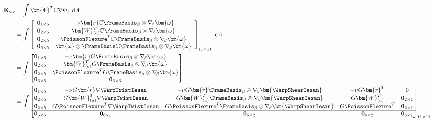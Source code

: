 \begin{ComponentExpression}
$$
\begin{aligned}
\mathbf{K}_{\rm wv} &= \int \bm{\Phi}^T\mathbb{C}\nabla\Phi_{\parallel}\mathrm{~d}A \\
&=\int
\left[\begin{array}{cc}
\mathbf{0}_{1 \times 5} & -\nu \bm{r} \mathbb{C} \FrameBasis_{\beta} \otimes \nabla_{\!\beta} \bm{\omega} \\
\mathbf{0}_{2 \times 5} & \bm{W}_{(a)}^T \mathbb{C}\FrameBasis_{\beta} \otimes \nabla_{\!\beta} \bm{\omega} \\
\mathbf{0}_{2 \times 5} & \PoissonFlexure^T \mathbb{C}\FrameBasis_{\beta} \otimes \nabla_{\!\beta} \bm{\omega} \\
\mathbf{0}_{6 \times 5} & \bm{\omega}\otimes\FrameBasis\mathbb{C}\FrameBasis_{\beta} \otimes \nabla_{\!\beta} \bm{\omega}
\end{array}
\right]_{11\times11}\mathrm{~d}A \\
&= \int \begin{bmatrix}
\mathbf{0}_{1 \times 5} & -\nu \bm{r} G \FrameBasis_{\beta} \otimes \nabla_{\!\beta} \bm{\omega} \\
\mathbf{0}_{2 \times 5} & \bm{W}_{(a)}^T G\FrameBasis_{\beta} \otimes \nabla_{\!\beta} \bm{\omega} \\
\mathbf{0}_{2 \times 5} & \PoissonFlexure^T G\FrameBasis_{\beta} \otimes \nabla_{\!\beta} \bm{\omega} \\
\mathbf{0}_{6 \times 5} & \mathbf{0}_{6\times 6}
\end{bmatrix} \\
&= \int \begin{bmatrix}
\mathbf{0}_{1 \times 5} 
& -\nu G \bm{r} \nabla\WarpTwistIesan
& -\nu G \bm{r} \FrameBasis_{\beta} \otimes \nabla_{\!\beta} \bm{\WarpShearIesan}
& -\nu G \bm{r}^T
& 0
\\
\mathbf{0}_{2 \times 5} 
& G\bm{W}_{(a)}^T \nabla \WarpTwistIesan 
& G\bm{W}_{(a)}^T \FrameBasis_{\beta} \otimes \nabla_{\!\beta} \bm{\WarpShearIesan} 
& G\bm{W}_{(a)}^T & \mathbf{0}_{2\times1}\\
\mathbf{0}_{2 \times 5} 
& G\PoissonFlexure^T \nabla \WarpTwistIesan 
& G\PoissonFlexure^T \FrameBasis_{\beta} \otimes \nabla_{\!\beta} \bm{\WarpShearIesan} 
& G\PoissonFlexure^T & \mathbf{0}_{2\times1}\\ \hline
\mathbf{0}_{6 \times 5} & \mathbf{0}_{6\times 1} & \mathbf{0}_{6\times 2}& \mathbf{0}_{6\times 2} & \mathbf{0}_{6\times 1}
\end{bmatrix}_{11\times11} \\

\end{aligned}$$
\end{ComponentExpression}
